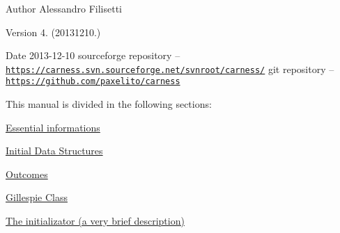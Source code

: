 \begin{DoxyAuthor}{Author}
Alessandro Filisetti 
\end{DoxyAuthor}
\begin{DoxyVersion}{Version}
4. (20131210.) 
\end{DoxyVersion}
\begin{DoxyDate}{Date}
2013-\/12-\/10 sourceforge repository -- \href{https://carness.svn.sourceforge.net/svnroot/carness/}{\tt https\-://carness.\-svn.\-sourceforge.\-net/svnroot/carness/} git repository -- \href{https://github.com/paxelito/carness}{\tt https\-://github.\-com/paxelito/carness}
\end{DoxyDate}
This manual is divided in the following sections\-:
\begin{DoxyItemize}
\item \hyperlink{intro}{Essential informations}
\item \hyperlink{pageInitStr}{Initial Data Structures}
\item \hyperlink{pageoutcomes}{Outcomes}
\item \hyperlink{pageGillespie}{Gillespie Class}
\item \hyperlink{pageInitializator}{The initializator (a very brief description)} 
\end{DoxyItemize}